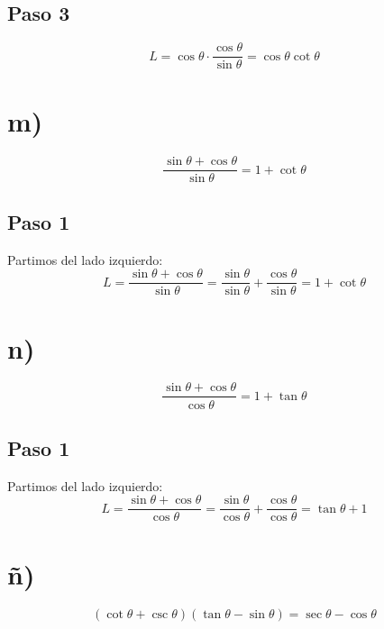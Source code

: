 \documentclass[12pt,a4paper]{article}
\begin{document}
\subsection*{Paso 3}
\[
L = \cos\theta \cdot \frac{\cos\theta}{\sin\theta} = \cos\theta\cot\theta
\]

\newpage
\section*{m)}

\begin{identidad}
\[
\frac{\sin\theta+\cos\theta}{\sin\theta}
=
1+\cot\theta
\]
\end{identidad}

\subsection*{Paso 1}
Partimos del lado izquierdo:
\[
L = \frac{\sin\theta+\cos\theta}{\sin\theta}
= \frac{\sin\theta}{\sin\theta} + \frac{\cos\theta}{\sin\theta}
= 1 + \cot\theta
\]

\newpage
\section*{n)}

\begin{identidad}
\[
\frac{\sin\theta+\cos\theta}{\cos\theta}
=
1+\tan\theta
\]
\end{identidad}

\subsection*{Paso 1}
Partimos del lado izquierdo:
\[
L = \frac{\sin\theta+\cos\theta}{\cos\theta}
= \frac{\sin\theta}{\cos\theta} + \frac{\cos\theta}{\cos\theta}
= \tan\theta + 1
\]

\newpage
\section*{ñ)}

\begin{identidad}
\[
(\cot\theta+\csc\theta)(\tan\theta-\sin\theta)
=
\sec\theta-\cos\theta
\]
\end{identidad}
\end{document}
